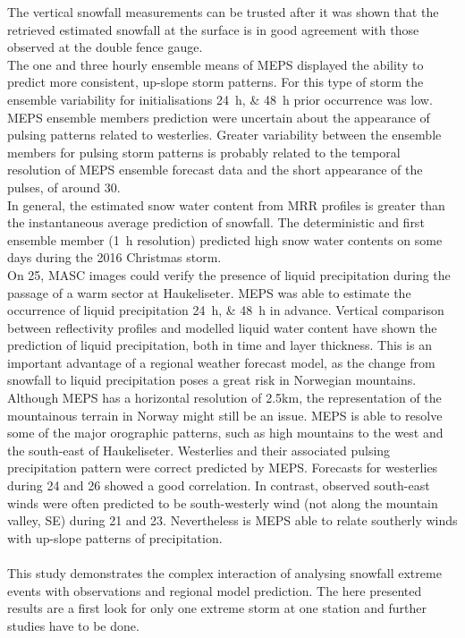 \par\medskip
\noindent
The vertical snowfall measurements can be trusted after it was shown that the retrieved estimated snowfall at the surface is in good agreement with those observed at the double fence gauge.
\\
The one and three hourly ensemble means of MEPS displayed the ability to predict more consistent, up-slope storm patterns. For this type of storm the ensemble variability for initialisations \SIlist{24;48}{\hour} prior occurrence was low. MEPS ensemble members prediction were uncertain about the appearance of pulsing patterns related to westerlies. Greater variability between the ensemble members for pulsing storm patterns is probably related to the temporal resolution of MEPS ensemble forecast data and the short appearance of the pulses, of around \SI{30}{\min}.
\\
In general, the estimated snow water content from MRR profiles is greater than the instantaneous average prediction of snowfall. The deterministic and first ensemble member (\SI{1}{\hour} resolution) predicted high snow water contents on some days during the 2016 Christmas storm.
\\
On \SI{25}{\dec}, MASC images could verify the presence of liquid precipitation during the passage of a warm sector at Haukeliseter. MEPS was able to estimate the occurrence of liquid precipitation \SIlist{24;48}{\hour} in advance. Vertical comparison between reflectivity profiles and modelled liquid water content have shown the prediction of liquid precipitation, both in time and layer thickness. This is an important advantage of a regional weather forecast model, as the change from snowfall to liquid precipitation poses a great risk in Norwegian mountains. 
\\
Although MEPS has a horizontal resolution of 2.5km, the representation of the mountainous terrain in Norway might still be an issue. MEPS is able to resolve some of the major orographic patterns, such as high mountains to the west and the south-east of Haukeliseter. Westerlies and their associated pulsing precipitation pattern were correct predicted by MEPS. Forecasts for westerlies during \num{24} and \SI{26}{\dec} showed a good correlation. In contrast, observed south-east winds were often predicted to be south-westerly wind (not along the mountain valley, SE) during \num{21} and \SI{23}{\dec}. Nevertheless is MEPS able to relate southerly winds with up-slope patterns of precipitation.
\\
\\
This study demonstrates the complex interaction of analysing snowfall extreme events with observations and regional model prediction.
The here presented results are a first look for only one extreme storm at one station and further studies have to be done. 


